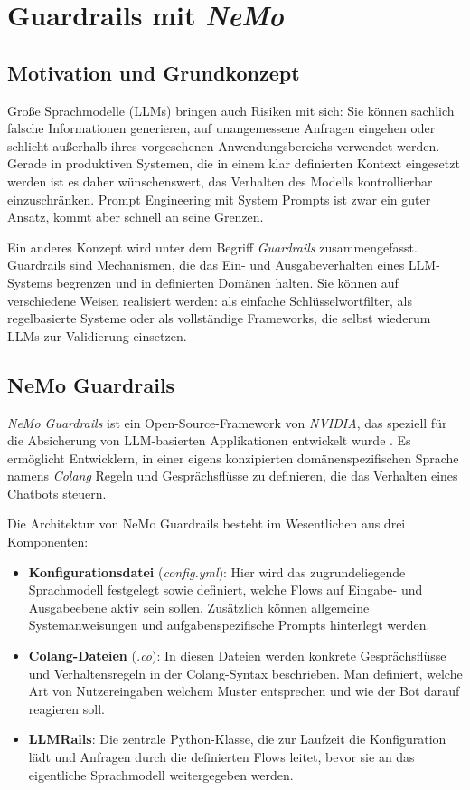 \chapter{Guardrails mit \emph{NeMo}}
\label{chap: guardrails}

\section{Motivation und Grundkonzept}

Große Sprachmodelle (LLMs) bringen auch Risiken mit sich:
Sie können sachlich falsche Informationen generieren, auf unangemessene Anfragen eingehen oder
schlicht außerhalb ihres vorgesehenen Anwendungsbereichs verwendet werden. Gerade in produktiven
Systemen, die in einem klar definierten Kontext eingesetzt werden ist es daher wünschenswert, 
das Verhalten des Modells kontrollierbar einzuschränken. Prompt Engineering mit System Prompts
ist zwar ein guter Ansatz, kommt aber schnell an seine Grenzen.

Ein anderes Konzept wird unter dem Begriff \emph{Guardrails} zusammengefasst. Guardrails sind
Mechanismen, die das Ein- und Ausgabeverhalten eines LLM-Systems begrenzen und in definierten
Domänen halten. Sie können auf verschiedene Weisen realisiert werden: als einfache Schlüsselwortfilter,
als regelbasierte Systeme oder als vollständige Frameworks, die selbst wiederum LLMs zur Validierung
einsetzen.

\section{NeMo Guardrails}

\emph{NeMo Guardrails} ist ein Open-Source-Framework von \emph{NVIDIA}, das speziell für die
Absicherung von LLM-basierten Applikationen entwickelt wurde \cite{nemoguardrails}. Es ermöglicht
Entwicklern, in einer eigens konzipierten domänenspezifischen Sprache namens \emph{Colang}
Regeln und Gesprächsflüsse zu definieren, die das Verhalten eines Chatbots steuern.

Die Architektur von NeMo Guardrails besteht im Wesentlichen aus drei Komponenten:

\begin{itemize}
    \item \textbf{Konfigurationsdatei} (\emph{config.yml}): Hier wird das zugrundeliegende Sprachmodell
    festgelegt sowie definiert, welche Flows auf Eingabe- und Ausgabeebene aktiv sein sollen.
    Zusätzlich können allgemeine Systemanweisungen und aufgabenspezifische Prompts hinterlegt werden.
    \item \textbf{Colang-Dateien} (\emph{.co}): In diesen Dateien werden konkrete Gesprächsflüsse
    und Verhaltensregeln in der Colang-Syntax beschrieben. Man definiert, welche Art von Nutzereingaben
    welchem Muster entsprechen und wie der Bot darauf reagieren soll.
    \item \textbf{LLMRails}: Die zentrale Python-Klasse, die zur Laufzeit die Konfiguration lädt und
    Anfragen durch die definierten Flows leitet, bevor sie an das eigentliche Sprachmodell weitergegeben werden.
\end{itemize}


